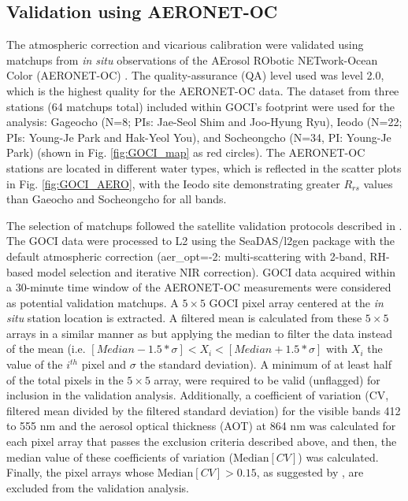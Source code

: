 \documentclass[10pt]{article}
\begin{document}
\subsection{Validation using AERONET-OC}
The atmospheric correction and vicarious calibration were validated using matchups from {\it in situ} observations of the AErosol RObotic NETwork-Ocean Color (AERONET-OC) \cite{Zibordi2009}. The quality-assurance (QA) level used was level 2.0, which is the highest quality for the AERONET-OC data. The dataset from three stations (64 matchups total) included within GOCI's footprint were used for the analysis: Gageocho (N=8; PIs: Jae-Seol Shim and Joo-Hyung Ryu), Ieodo (N=22; PIs: Young-Je Park and Hak-Yeol You), and Socheongcho (N=34, PI: Young-Je Park) (shown in Fig. \ref{fig:GOCI_map} as red circles). The AERONET-OC stations are located in different water types, which is reflected in the scatter plots in Fig. \ref{fig:GOCI_AERO}, with the Ieodo site demonstrating greater $R_{rs}$ values than Gaeocho and Socheongcho for all bands. 


The selection of matchups followed the satellite validation protocols described in \cite{Bailey2006}. The GOCI data were processed to L2 using the SeaDAS/l2gen package with the default atmospheric correction (aer\_opt=-2: multi-scattering with 2-band, RH-based model selection and iterative NIR correction). GOCI data acquired within a 30-minute time window of the AERONET-OC measurements were considered as potential validation matchups. A $5\times5$ GOCI pixel array centered at the {\it in situ} station location is extracted. A filtered mean is calculated from these $5\times5$ arrays in a similar manner as \cite{Bailey2006} but applying the median to filter the data instead of the mean (i.e. $[Median-1.5*\sigma] <  X_i < [Median+1.5*\sigma]$ with $X_i$ the value of the $i^{th}$ pixel and $\sigma$ the standard deviation). A minimum of at least half of the total pixels in the $5\times5$ array, were required to be valid (unflagged) for inclusion in the validation analysis. Additionally, a coefficient of variation (CV, filtered mean divided by the filtered standard deviation) for the visible bands 412 to 555 nm and the aerosol optical thickness (AOT) at 864 nm was calculated for each pixel array that passes the exclusion criteria described above, and then, the median value of these coefficients of variation ($\text{Median}[CV]$) was calculated. Finally, the pixel arrays whose $\text{Median}[CV]>0.15$, as suggested by \cite{Bailey2006}, are excluded from the validation analysis.
\end{document}
